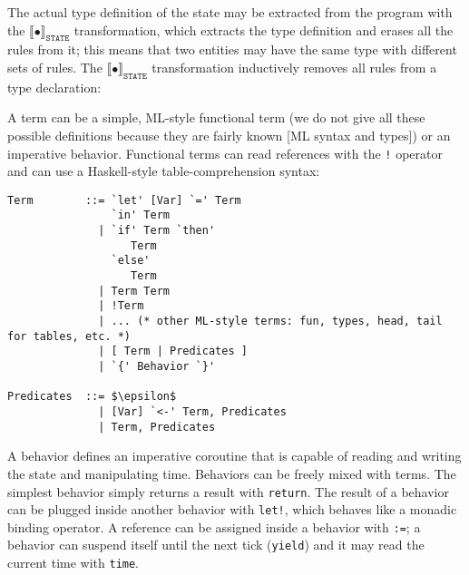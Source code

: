 The actual type definition of the state may be extracted from the program with the $\llbracket \bullet \rrbracket_{\mathtt{STATE}}$ transformation, which extracts the type definition and erases all the rules from it; this means that two entities may have the same type with different sets of rules. The $\llbracket \bullet \rrbracket_{\mathtt{STATE}}$ transformation inductively removes all rules from a type declaration:


A term can be a simple, ML-style functional term (we do not give all these possible definitions because they are fairly known [ML syntax and types]) or an imperative behavior. Functional terms can read references with the \texttt{!} operator and can use a Haskell-style table-comprehension syntax:

\begin{lstlisting}
Term        ::= `let' [Var] `=' Term 
                `in' Term
              | `if' Term `then' 
                   Term 
                `else' 
                   Term
              | Term Term
              | !Term
              | ... (* other ML-style terms: fun, types, head, tail for tables, etc. *)
              | [ Term | Predicates ]
              | `{' Behavior `}'
              
Predicates  ::= $\epsilon$
              | [Var] `<-' Term, Predicates
              | Term, Predicates
\end{lstlisting}

A behavior defines an imperative coroutine that is capable of reading and writing the state and manipulating time. Behaviors can be freely mixed with terms. The simplest behavior simply returns a result with \texttt{return}. The result of a behavior can be plugged inside another behavior with \texttt{let!}, which behaves like a monadic binding operator. A reference can be assigned inside a behavior with \texttt{:=}; a behavior can suspend itself until the next tick (\texttt{yield}) and it may read the current time with \texttt{time}.

